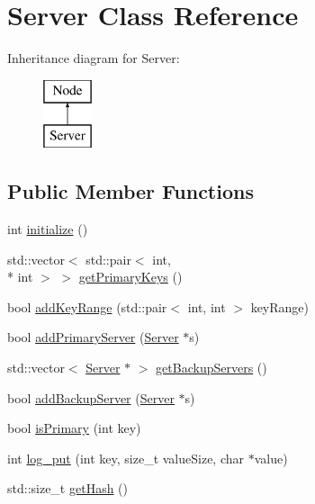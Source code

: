 \hypertarget{classServer}{\section{Server Class Reference}
\label{classServer}
}
Inheritance diagram for Server\-:\begin{figure}[H]
\begin{center}
\leavevmode
\includegraphics[height=2.000000cm]{classServer}
\end{center}
\end{figure}
\subsection*{Public Member Functions}
\begin{DoxyCompactItemize}
\item 
int \hyperlink{classServer_ae94d08657f48a3b51b411463f1137375}{initialize} ()
\item 
std\-::vector$<$ std\-::pair$<$ int, \\*
int $>$ $>$ \hyperlink{classServer_ad303d839086eee11137e6fc4a4bb95ab}{get\-Primary\-Keys} ()
\item 
bool \hyperlink{classServer_a395d7cb7194064c961710663926e4a3d}{add\-Key\-Range} (std\-::pair$<$ int, int $>$ key\-Range)
\item 
bool \hyperlink{classServer_a2f865f52beecb3be03eda85b4dc64e3e}{add\-Primary\-Server} (\hyperlink{classServer}{Server} $\ast$s)
\item 
std\-::vector$<$ \hyperlink{classServer}{Server} $\ast$ $>$ \hyperlink{classServer_a71a34c248da1cb74f3453f06223a606e}{get\-Backup\-Servers} ()
\item 
bool \hyperlink{classServer_ab272570a3b1d8eb7f9037c9e7b4e5f2a}{add\-Backup\-Server} (\hyperlink{classServer}{Server} $\ast$s)
\item 
bool \hyperlink{classServer_a9bd7a3b2b12f2f5bddd68eb245111d02}{is\-Primary} (int key)
\item 
int \hyperlink{classServer_a17fd9b41cd477cd9aafd19ac7edc1183}{log\-\_\-put} (int key, size\-\_\-t value\-Size, char $\ast$value)
\item 
std\-::size\-\_\-t \hyperlink{classServer_adecf34082977620ca31ca8eab317cf6d}{get\-Hash} ()
\end{DoxyCompactItemize}
